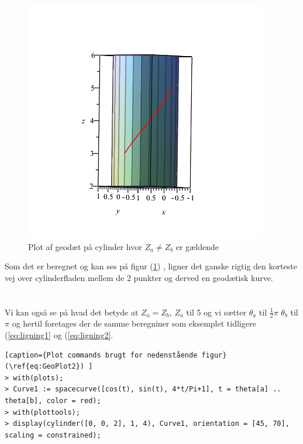 \begin{figure}
\center
\includegraphics[scale=0.4]{pictures/Opg8_figur11.png}  
\caption{Plot af geodæt på cylinder hvor $Z_a\neq Z_b$ er gældende }
\label{eq:GeoPlot1}
\end{figure}
Som det er beregnet og kan ses på figur  (\ref{eq:GeoPlot1}) , ligner det ganske rigtig den korteste vej over cylinderfladen mellem de 2 punkter og derved en geodætisk kurve.
\\
\\
\\
Vi kan også se på hvad det betyde at $Z_a=Z_b$, $Z_a$ til 5 og vi sætter $\theta_a$ til $\frac{1}{2}\pi$ $\theta_b$ til $\pi$ og hertil foretages der de samme beregniner som eksemplet tidligere (\ref{eq:ligning1} og (\ref{eq:ligning2}.
\begin{lstlisting}[caption={Plot commands brugt for nedenstående figur}(\ref{eq:GeoPlot2}) ]
> with(plots);
> Curve1 := spacecurve([cos(t), sin(t), 4*t/Pi+1], t = theta[a] .. theta[b], color = red);
> with(plottools);
> display(cylinder([0, 0, 2], 1, 4), Curve1, orientation = [45, 70], scaling = constrained);

\end{lstlisting}
